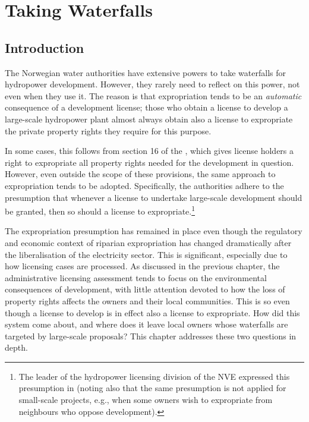 \chapter{Taking Waterfalls}\label{chap:5}

\section{Introduction}\label{sec:5:1}

The Norwegian water authorities have extensive powers to take waterfalls for hydropower development. However, they rarely need to reflect on this power, not even when they use it. The reason is that expropriation tends to be an {\it automatic} consequence of a development license; those who obtain a license to develop a large-scale hydropower plant almost always obtain also a license to expropriate the private property rights they require for this purpose.

In some cases, this follows from section 16 of the \cite{wra17}, which gives license holders a right to expropriate all property rights needed for the development in question. However, even outside the scope of these provisions, the same approach to expropriation tends to be adopted. Specifically, the authorities adhere to the presumption that whenever a license to undertake large-scale development should be granted, then so should a license to expropriate.\footnote{The leader of the hydropower licensing division of the NVE expressed this presumption in \cite{flatby08} (noting also that the same presumption is not applied for small-scale projects, e.g., when some owners wish to expropriate from neighbours who oppose development).}

The expropriation presumption has remained in place even though the regulatory and economic context of riparian expropriation has changed dramatically after the liberalisation of the electricity sector.
This is significant, especially due to how licensing cases are processed. As discussed in the previous chapter, the administrative licensing assessment tends to focus on the environmental consequences of development, with little attention devoted to how the loss of property rights affects the owners and their local communities. This is so even though a license to develop is in effect also a license to expropriate. How did this system come about, and where does it leave local owners whose waterfalls are targeted by large-scale proposals? This chapter addresses these two questions in depth. 

